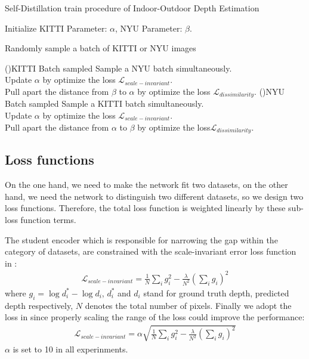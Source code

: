 \documentclass{svjour3}                     %
\begin{document}
\begin{algorithm*}[tbh]
  \caption{Self-Distillation train procedure of Indoor-Outdoor Depth Estimation}

      Initialize KITTI Parameter: $\alpha$,
      NYU Parameter: $\beta$.
      
      {Randomly sample a batch of KITTI or NYU images

        \If(){KITTI Batch sampled}{
          Sample a NYU batch simultaneously.\\
        Update $\alpha$ by optimize the loss $\mathcal{L}_{scale-invariant}$.\\
        Pull apart the distance from $\beta$ to $\alpha$ by optimize the loss $\mathcal{L}_{dissimilarity}$.
        }
        \If(){NYU Batch sampled}{
          Sample a KITTI batch simultaneously.\\
        Update $\alpha$ by optimize the loss $\mathcal{L}_{scale-invariant}$.\\
        Pull apart the distance from $\alpha$ to $\beta$ by optimize the loss$\mathcal{L}_{dissimilarity}$.
        }
      }
  \label{alg:backbone_alg}
  \end{algorithm*}

\subsection{Loss functions}
On the one hand, we need to make the network fit two
datasets, on the other hand, we need the network to
distinguish  two different datasets, so we design
two loss functions. Therefore, the total loss function is
weighted linearly by these sub-loss function terms.

The student encoder which is responsible for narrowing the gap within the
category of datasets, are constrained with the 
scale-invariant error loss function in \cite{eigen2014depth}:
\begin{align}
  \mathcal{L}_{scale-invariant} = \frac{1}{N}\sum_{i}g_i^2-\frac{\lambda}{N^2}(\sum_{i}g_i)^2
\end{align}
where $g_i=\log d_i^*-\log d_i$, $d_i^*$ and $d_i$ stand for ground truth depth, 
predicted depth respectively, $N$
denotes the total number of pixels. Finally we adopt
the loss in \cite{bts} since properly scaling the range of the loss could improve the performance:
\begin{align}
 \mathcal{L}_{scale-invariant} = \alpha\sqrt{\frac{1}{N}\sum_{i}g_i^2-\frac{\lambda}{N^2}(\sum_{i}g_i)^2} 
\end{align}
$\alpha$ is set to 10 in all experinments.
\end{document}
